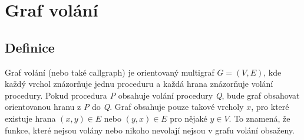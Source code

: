 \documentclass[11pt,final,oneside]{fithesis}
\begin{document}

\section{Graf volání}\label{sec-callgraph}

\subsection{Definice}
Graf volání (nebo také callgraph) je orientovaný multigraf $G = (V, E)$, kde každý vrchol znázorňuje jednu proceduru a každá hrana znázorňuje volání procedury\cite{compilers}. Pokud procedura \textit{P} obsahuje volání procedury \textit{Q}, bude graf obsahovat orientovanou hranu z \textit{P} do \textit{Q}. Graf obsahuje pouze takové vrcholy $x$, pro které existuje hrana $(x, y) \in E$ nebo $(y, x) \in E$ pro nějaké $y \in V$. To znamená, že funkce, které nejsou volány nebo nikoho nevolají nejsou v grafu volání obsaženy. 
\end{document}
